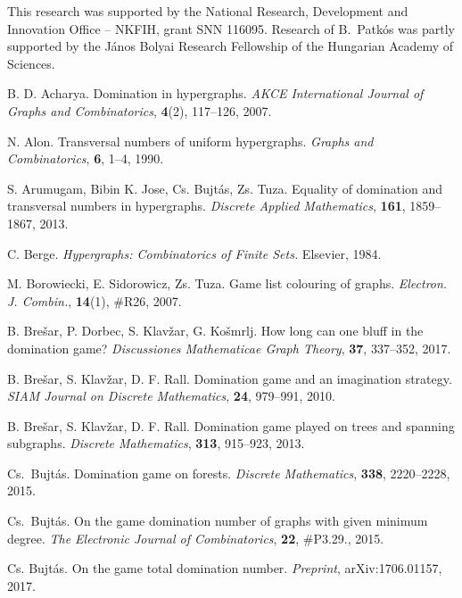 \documentclass[12pt]{article}
\begin{document}
This research was supported by the National Research, Development and Innovation Office -- NKFIH, grant SNN 116095.
Research of B.\ Patk\'os was partly supported by the J\'anos Bolyai Research Fellowship of the Hungarian Academy of Sciences.
\smallskip





\begin{thebibliography}{99}

 B. D. Acharya. Domination in hypergraphs. {\it AKCE International Journal of Graphs and Combinatorics}, \textbf{4}(2), 117--126, 2007.

N. Alon. Transversal numbers of uniform hypergraphs. {\it Graphs and Combinatorics}, \textbf{6}, 1--4, 1990.

S. Arumugam, Bibin K. Jose, Cs. Bujt{\'{a}}s, Zs. Tuza.
Equality of domination and transversal numbers in hypergraphs.
\textit{Discrete Applied Mathematics}, \textbf{161}, 1859--1867, 2013.

 C. Berge. \textit{Hypergraphs: Combinatorics of Finite Sets.}
Elsevier, 1984.

 M. Borowiecki, E. Sidorowicz, Zs. Tuza.  Game list colouring of graphs. \textit{Electron. J. Combin.}, \textbf{14}(1), \#R26, 2007.

 B. Bre\v{s}ar, P. Dorbec, S. Klav\v{z}ar, G. Ko\v smrlj. 
How long can one bluff in the domination game?
\textit{Discussiones Mathematicae Graph Theory},
\textbf{37}, 337--352, 2017.

 B. Bre\v{s}ar, S. Klav\v{z}ar, D. F. Rall.
    Domination game and an imagination strategy.
    {\it  SIAM Journal on Discrete Mathematics},
  {\bfseries 24}, 979--991, 2010.

  B. Bre\v{s}ar, S. Klav\v{z}ar, D. F. Rall.
   Domination game played on trees and spanning subgraphs.
   {\it  Discrete Mathematics},
{\bfseries 313}, 915--923, 2013.

Cs.\ Bujt\'as. Domination game on forests.
  {\it  Discrete Mathematics}, {\bfseries 338}, 2220--2228, 2015.

Cs.\ Bujt\'as. On the game domination number of graphs with given minimum degree. {\it The Electronic Journal of Combinatorics}, {\bfseries 22}, \#P3.29., 2015.

 Cs. Bujt\'as. On the game total domination number. \textit{Preprint}, arXiv:1706.01157, 2017.


\end{thebibliography}
\end{document}

